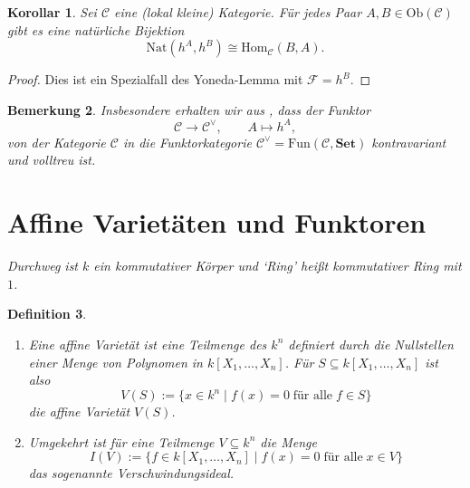\documentclass[a4paper, 11pt]{scrartcl}
\newcommand{\Hom}{\text{Hom}}
\newcommand{\Ob}{\text{Ob}}
\theoremstyle{basicstyle}
\newtheorem{definition}{Definition}[section]
\newtheorem{bemerkung}[definition]{Bemerkung}
\newtheorem{korollar}[definition]{Korollar}
\begin{document}
    \begin{korollar}\label{kor:1}
        Sei \(\mathcal{C}\) eine (lokal kleine) Kategorie.
        Für jedes Paar \(A, B \in \Ob(\mathcal{C})\) gibt es eine natürliche Bijektion
        \[\text{Nat}(h^A, h^B) \cong \Hom_{\mathcal{C}}(B, A).\]
    \end{korollar}
    \begin{proof}
        Dies ist ein Spezialfall des Yoneda-Lemma mit \(\mathcal{F} = h^B\).
    \end{proof}

    \begin{bemerkung}\label{bem:2}
        Insbesondere erhalten wir aus , dass der Funktor
        \[\mathcal{C} \longrightarrow \mathcal{C}^\vee, \qquad A \mapsto h^A,\]
        von der Kategorie \(\mathcal{C}\) in die Funktorkategorie \(\mathcal{C}^\vee = \text{Fun}(\mathcal{C}, \textbf{Set})\) kontravariant und volltreu ist. %
    \end{bemerkung}


    \section{Affine Varietäten und Funktoren}
    
    {\itshape Durchweg ist \(k\) ein kommutativer Körper und `Ring' heißt kommutativer Ring mit \(1\).}
    
    \begin{definition}
        \begin{enumerate}
            \item Eine \emph{affine Varietät} ist eine Teilmenge des \(k^n\) definiert durch die Nullstellen einer Menge von Polynomen in \(k[X_1, \ldots, X_n]\).
                Für \(S \subseteq k[X_1, \ldots, X_n]\) ist also 
                \[V(S) := \{x \in k^n \;\vert\; f(x) = 0 \; \text{für alle}\; f \in S\}\]
                die affine Varietät \(V(S)\).

            \item Umgekehrt ist für eine Teilmenge \(V \subseteq k^n\) die Menge
                \[I(V) := \{f \in k[X_1, \ldots, X_n] \;\vert\; f(x) = 0 \;\text{für alle}\; x \in V\}\]
                das sogenannte \emph{Verschwindungsideal}.
        \end{enumerate}
    \end{definition}
\end{document}
